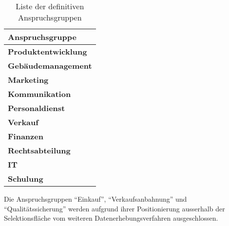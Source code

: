 \documentclass[../../main.tex]{subfiles}
\begin{document}
\begin{table}[H]
\tablefontsize	
\caption{Liste der definitiven Anspruchsgruppen}
\label{definitive_anspruchsgruppen}


\begin{tabular}{ |p{8cm}| }


\hline
\tableheaderbgcolor
\textbf{Anspruchsgruppe} \\ 
\hline


\textbf{Produktentwicklung}             \\ \hline
\textbf{Gebäudemanagement}              \\ \hline
\textbf{Marketing}                      \\ \hline
\textbf{Kommunikation}                   \\ \hline
\textbf{Personaldienst}                 \\ \hline
\textbf{Verkauf}                        \\ \hline
\textbf{Finanzen}                       \\ \hline
\textbf{Rechtsabteilung}                \\ \hline
\textbf{IT}                             \\ \hline
\textbf{Schulung}                       \\ \hline

\end{tabular}
\end{table}

\begin{sloppypar}
Die Anspruchsgruppen "`Einkauf"', "`Verkaufsanbahnung"' und "`Qualitätssicherung"' werden aufgrund ihrer Positionierung ausserhalb der Selektionsfläche vom weiteren Datenerhebungsverfahren ausgeschlossen.
\end{sloppypar}
\end{document}
